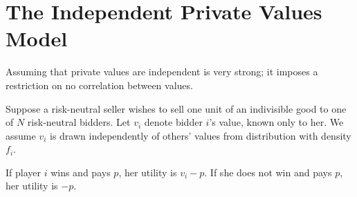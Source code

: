 \section{The Independent Private Values Model}

Assuming that private values are independent is very strong; it imposes a restriction on no correlation between values.

Suppose a risk-neutral seller wishes to sell one unit of an indivisible good to one of $N$ risk-neutral bidders. Let $v_i$ denote bidder $i$'s value, known only to her. We assume $v_i$ is drawn independently of others' values from distribution with density $f_i$.

If player $i$ wins and pays $p$, her utility is $v_i - p$. If she does not win and pays $p$, her utility is $-p$.
